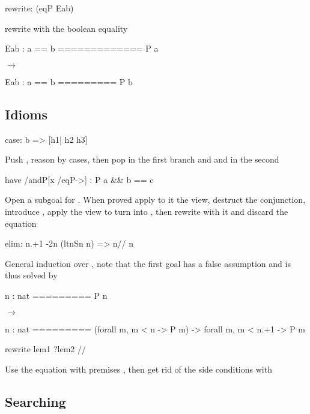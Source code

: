 \begin{landscape}
\begin{small}
\begin{multicols*}{3}[\begin{center}\section*{}\end{center}]
\begin{cheat}
rewrite: (eqP Eab)
\end{cheat}
rewrite with the boolean equality 


\begin{cheatout}
 Eab : a == b
=============
 P a
\end{cheatout}
$\to$
\begin{cheatout}
 Eab : a == b
=========
 P b
\end{cheatout}


\subsection*{Idioms}

\begin{cheat}
case: b => [h1| h2 h3]
\end{cheat}
  Push , reason by cases, then pop
   in the first branch and  and  in the second

\begin{cheat}
have /andP[x /eqP->] : P a && b == c
\end{cheat}
  Open a subgoal for . When proved
  apply to it the  view, destruct the conjunction,
  introduce , apply the view  to turn
   into , then rewrite with it and discard the
  equation

\begin{cheat}
elim: n.+1 {-2}n (ltnSn n) => {n}// n
\end{cheat}
  General induction over , note that the first goal
  has a false assumption  and is
  thus solved by \C{//}

\begin{cheatout}
 n : nat
=========
 P n
\end{cheatout}
$\to$
\begin{cheatout}
 n : nat
=========
(forall m, m < n -> P m) ->
  forall m, m < n.+1 -> P m
\end{cheatout}


\begin{cheat}
rewrite lem1 ?lem2 //
\end{cheat}
  Use the equation with premises , then
  get rid of the side conditions with 

\subsection*{Searching}


\end{multicols*}
\end{small}
\end{landscape}
